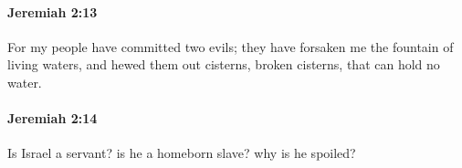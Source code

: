 		\paragraph{Jeremiah 2:13} %
			\label{JEREMIAH-2-13}

			For my people have committed two evils; they have forsaken me the fountain of living waters, and hewed them out cisterns, broken cisterns, that can hold no water.


		\paragraph{Jeremiah 2:14} %
			\label{JEREMIAH-2-14}

			Is Israel a servant? is he a homeborn slave? why is he spoiled?



